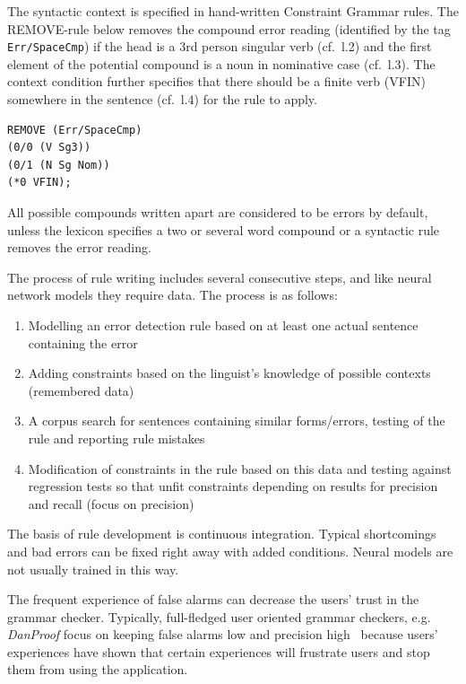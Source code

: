\documentclass[postprint]{flammie}
\begin{document}
The syntactic context is specified in hand-written Constraint Grammar rules. The
REMOVE-rule below removes the compound error reading (identified by the tag
\texttt{Err/SpaceCmp}) if the head is a 3rd person singular verb (cf.\ l.2) and
the first element of the potential compound is a noun in nominative case (cf.\
l.3). The context condition further specifies that there should be a finite verb
(VFIN) somewhere in the sentence (cf.\ l.4) for the rule to apply.

\begin{Verbatim}[frame=single,framerule=0.2mm,framesep=3mm,fontsize=\footnotesize,baselinestretch=1]
REMOVE (Err/SpaceCmp)
(0/0 (V Sg3))
(0/1 (N Sg Nom))
(*0 VFIN);
\end{Verbatim}


All possible compounds written apart are considered to be errors by default,
unless the lexicon specifies a two or several word compound or a syntactic rule
removes the error reading.

The process of rule writing includes several consecutive steps, and like neural
network models they require data. The process is as follows:

\begin{enumerate}
    \item Modelling an error detection rule based on at least one actual
        sentence containing the error
    \item Adding constraints based on the linguist's knowledge of possible
        contexts (remembered data)
    \item A corpus search for sentences containing similar forms/errors, testing
        of the rule and reporting rule mistakes
    \item Modification of constraints in the rule based on this data and testing
        against regression tests so that unfit constraints depending on results
        for precision and recall (focus on precision)
\end{enumerate}

The basis of rule development is continuous integration. Typical shortcomings
and bad errors can be fixed right away with added conditions. Neural models are
not usually trained in this way.

The frequent experience of false alarms can decrease the users' trust in the
grammar checker.  Typically, full-fledged user oriented grammar checkers, e.g.
\textit{DanProof} focus on keeping false alarms low and precision
high~\cite{bick2015danproof} because users' experiences have shown that certain
experiences will frustrate users and stop them from using the application.
\end{document}
